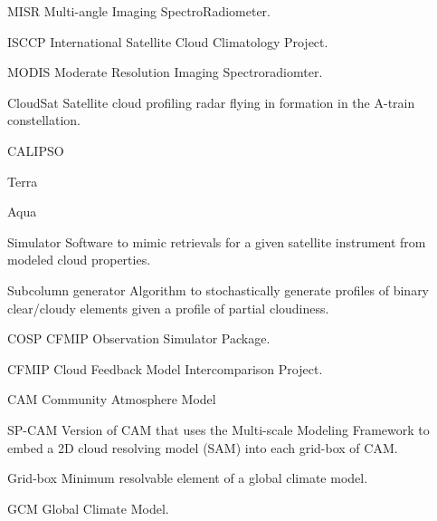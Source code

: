 \begin{glossary}
\item[MISR] Multi-angle Imaging SpectroRadiometer.
\item[ISCCP] International Satellite Cloud Climatology Project.
\item[MODIS] Moderate Resolution Imaging Spectroradiomter.
\item[CloudSat] Satellite cloud profiling radar flying in formation in the A-train constellation.
\item[CALIPSO]
\item[Terra]
\item[Aqua]
\item[Simulator] Software to mimic retrievals for a given satellite instrument from modeled cloud properties.
\item[Subcolumn generator] Algorithm to stochastically generate profiles of binary clear/cloudy elements given a profile of partial cloudiness.
\item[COSP] CFMIP Observation Simulator Package.
\item[CFMIP] Cloud Feedback Model Intercomparison Project.
\item[CAM] Community Atmosphere Model
\item[SP-CAM] Version of CAM that uses the Multi-scale Modeling Framework to embed a 2D cloud resolving model (SAM) into each grid-box of CAM.
\item[Grid-box] Minimum resolvable element of a global climate model.
\item[GCM] Global Climate Model.
\end{glossary}
